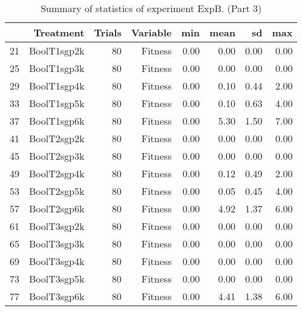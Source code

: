 \begin{table}[ht]
\centering
\begin{tabular}{rrrrrrrr}
  \hline
 & Treatment & Trials & Variable & min & mean & sd & max \\ 
  \hline
21 & BoolT1sgp2k &  80 & Fitness & 0.00 & 0.00 & 0.00 & 0.00 \\ 
  25 & BoolT1sgp3k &  80 & Fitness & 0.00 & 0.00 & 0.00 & 0.00 \\ 
  29 & BoolT1sgp4k &  80 & Fitness & 0.00 & 0.10 & 0.44 & 2.00 \\ 
  33 & BoolT1sgp5k &  80 & Fitness & 0.00 & 0.10 & 0.63 & 4.00 \\ 
  37 & BoolT1sgp6k &  80 & Fitness & 0.00 & 5.30 & 1.50 & 7.00 \\ 
  41 & BoolT2sgp2k &  80 & Fitness & 0.00 & 0.00 & 0.00 & 0.00 \\ 
  45 & BoolT2sgp3k &  80 & Fitness & 0.00 & 0.00 & 0.00 & 0.00 \\ 
  49 & BoolT2sgp4k &  80 & Fitness & 0.00 & 0.12 & 0.49 & 2.00 \\ 
  53 & BoolT2sgp5k &  80 & Fitness & 0.00 & 0.05 & 0.45 & 4.00 \\ 
  57 & BoolT2sgp6k &  80 & Fitness & 0.00 & 4.92 & 1.37 & 6.00 \\ 
  61 & BoolT3sgp2k &  80 & Fitness & 0.00 & 0.00 & 0.00 & 0.00 \\ 
  65 & BoolT3sgp3k &  80 & Fitness & 0.00 & 0.00 & 0.00 & 0.00 \\ 
  69 & BoolT3sgp4k &  80 & Fitness & 0.00 & 0.00 & 0.00 & 0.00 \\ 
  73 & BoolT3sgp5k &  80 & Fitness & 0.00 & 0.00 & 0.00 & 0.00 \\ 
  77 & BoolT3sgp6k &  80 & Fitness & 0.00 & 4.41 & 1.38 & 6.00 \\ 
   \hline
\end{tabular}
\caption{Summary of statistics of experiment ExpB. (Part 3)} 
\end{table}
